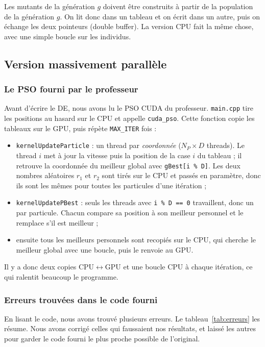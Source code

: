\documentclass[conference]{IEEEtran}
\begin{document}
Les mutants de la g\'en\'eration $g$ doivent \^etre construits \`a partir de la population de la g\'en\'eration $g$. On lit donc dans un tableau et on \'ecrit dans un autre, puis on \'echange les deux pointeurs (double buffer). La version CPU fait la m\^eme chose, avec une simple boucle sur les individus.

\subsection{Version massivement parall\`ele}

\subsubsection{Le PSO fourni par le professeur}
Avant d'\'ecrire le DE, nous avons lu le PSO CUDA du professeur. \texttt{main.cpp} tire les positions au hasard sur le CPU et appelle \texttt{cuda\_pso}. Cette fonction copie les tableaux sur le GPU, puis r\'ep\`ete \texttt{MAX\_ITER} fois :
\begin{itemize}
\item \texttt{kernelUpdateParticle} : un thread par \emph{coordonn\'ee} ($N_P\times D$ threads). Le thread $i$ met \`a jour la vitesse puis la position de la case $i$ du tableau ; il retrouve la coordonn\'ee du meilleur global avec \texttt{gBest[i \% D]}. Les deux nombres al\'eatoires $r_1$ et $r_2$ sont tir\'es sur le CPU et pass\'es en param\`etre, donc ils sont les m\^emes pour toutes les particules d'une it\'eration ;
\item \texttt{kernelUpdatePBest} : seuls les threads avec \texttt{i \% D == 0} travaillent, donc un par particule. Chacun compare sa position \`a son meilleur personnel et le remplace s'il est meilleur ;
\item ensuite tous les meilleurs personnels sont recopi\'es sur le CPU, qui cherche le meilleur global avec une boucle, puis le renvoie au GPU.
\end{itemize}
Il y a donc deux copies CPU$\leftrightarrow$GPU et une boucle CPU \`a chaque it\'eration, ce qui ralentit beaucoup le programme.

\subsubsection{Erreurs trouv\'ees dans le code fourni}
En lisant le code, nous avons trouv\'e plusieurs erreurs. Le tableau~\ref{tab:erreurs} les r\'esume. Nous avons corrig\'e celles qui faussaient nos r\'esultats, et laiss\'e les autres pour garder le code fourni le plus proche possible de l'original.
\end{document}
